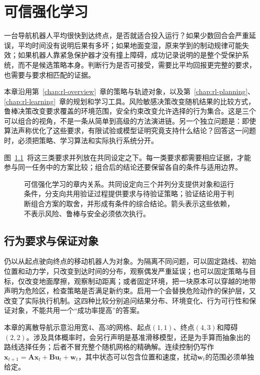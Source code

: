 \chapter{可信强化学习}
\label{chap:rl-trustworthy}

一台导航机器人平均很快到达终点，是否就适合投入运行？如果少数回合会严重延误，平均时间没有说明后果有多坏；如果地面变湿，原来学到的制动规律可能失效；如果机器人靠紧急保护器才没有撞上障碍，成功记录说明的是整个受保护系统，而不是候选策略本身。判断行为是否可接受，需要比平均回报更完整的要求，也需要与要求相匹配的证据。

本章沿用第~\ref{chap:rl-overview}~章的策略与轨迹对象，以及第~\ref{chap:rl-planning}、\ref{chap:rl-learning}~章的规划和学习工具。风险敏感决策改变随机结果的比较方式，鲁棒决策改变要求覆盖的环境范围，安全约束改变允许选择的行为集合。这是三个可以组合的视角，不是一条从简单到高级的方法演进链。另一个独立问题是：即使算法声称优化了这些要求，有限试验或模型证明究竟支持什么结论？回答这一问题时，必须把策略、学习算法和实际执行系统分开。

图~\ref{fig:rl-trustworthy-map}~将这三类要求并列放在共同设定之下。每一类要求都需要相应证据，才能参与同一任务中的方案比较；组合后的结论还要保留各自的条件与适用边界。

\begin{figure}[t]
  \centering
  
  \caption{可信强化学习的章内关系。共同设定向三个并列分支提供对象和运行条件，分支向共用验证过程提供要求与待验证策略；验证结论用于判断组合方案的取舍，并形成有条件的综合结论。箭头表示这些依赖，不表示风险、鲁棒与安全必须依次执行。}
  \label{fig:rl-trustworthy-map}
\end{figure}

\section{行为要求与保证对象}
\label{sec:rl-trustworthy-requirements}

仍以从起点驶向终点的移动机器人为对象。为隔离不同问题，可以固定路线、初始位置和动力学，只改变到达时间的分布，观察偶发严重延误；也可以固定策略与目标，仅改变地面摩擦，观察制动距离；或者固定环境，把一块原本可以穿越的地带声明为危险区，检查策略是否满足新约束。启用一个会替换危险动作的保护层，又改变了实际执行机制。这四种比较分别追问结果分布、环境变化、行为可行性和保证对象，不能共用一个“成功率提高”的答案。

本章的离散导航示意沿用宽4、高3的网格、起点$(1,1)$、终点$(4,3)$和障碍$(2,2)$。涉及具体概率时，会另行声明是基准滑移模型，还是为手算而抽象出的路线选择任务；后者不冒充整个随机网格的精确解。连续控制仍写作$\bm{x}_{t+1}=\bm{A}\bm{x}_t+\bm{B}\bm{u}_t+\bm{w}_t$，其中状态可以包含位置和速度，扰动$\bm{w}_t$的范围必须单独给定。

